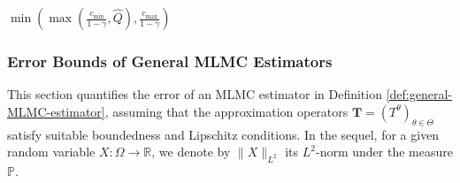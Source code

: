 \documentclass[11pt]{article}
\numberwithin{equation}{section}
\theoremstyle{definition}
\theoremstyle{remark}
\def\R{{\mathbb R}}
\begin{document}
\begin{algorithm}[H]

\caption{General MLMC Estimator for Reguarlized MDPs}
\label{alg:MLMC}
\begin{algorithmic}[1]
    \Else

        \Else
        \EndIf
        \EndFor
        
    \EndIf
   \State  \Return 
    $\min\left(\max\left(\frac{c_{\min}}{1-\gamma},\hat Q\right),\frac{c_{\max}}{1 - \gamma}\right)$
\EndFunction
\end{algorithmic}
\end{algorithm}

 \subsubsection{Error Bounds of General MLMC Estimators}


This section quantifies the error of an MLMC estimator  in Definition \ref{def:general-MLMC-estimator}, assuming that the    approximation operators 
 $\mathbf T = (T^{\theta})_{\theta \in \Theta}$ satisfy suitable boundedness and Lipschitz conditions.
 In the sequel,
 for a given random variable $X:\Omega\to \R$,
 we denote by $\|X\|_{L^2}$
its $L^2$-norm under  the measure $\mathbb P$.

 
 
\end{document}
